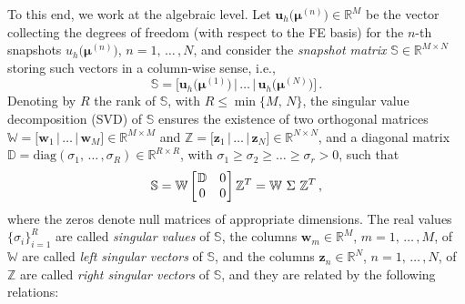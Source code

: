 \documentclass[12pt, a4paper, twoside, openright, notitlepage]{report}
\numberwithin{equation}{chapter}
\theoremstyle{theorem}
\theoremstyle{definition}
\theoremstyle{remark}
\theoremstyle{proposition}
\numberwithin{figure}{chapter}
\newcommand{\bg}[1]{\boldsymbol{#1}}
\begin{document}
		To this end, we work at the algebraic level. Let $\mathbf{u}_h \big( \bg{\mu}^{(n)} \big) \in \mathbb{R}^M$ be the vector collecting the degrees of freedom (with respect to the FE basis) for the $n$-th snapshots $u_h \big( \bg{\mu}^{(n)} \big)$, $n = 1, \, \ldots \, , N$, and consider the \emph{snapshot matrix} $\mathbb{S} \in \mathbb{R}^{M \times N}$ storing such vectors in a column-wise sense, i.e.,
		\begin{equation*}
			\mathbb{S} = \big[ \mathbf{u}_h \big( \bg{\mu}^{(1)} \big) \, \big| \, \ldots \, \big| \, \mathbf{u}_h \big( \bg{\mu}^{(N)} \big) \big] \, .
		\end{equation*}
		Denoting by $R$ the rank of $\mathbb{S}$, with $R \leq \min \big\lbrace{ M, \, N \big\rbrace}$, the singular value decomposition (SVD) of $\mathbb{S}$ ensures the existence of two orthogonal matrices $\mathbb{W} = \big[ \mathbf{w}_1 \, \big| \, \ldots \, \big| \, \mathbf{w}_M \big] \in \mathbb{R}^{M \times M}$ and $\mathbb{Z} = \big[ \mathbf{z}_1 \, \big| \, \ldots \, \big| \, \mathbf{z}_N \big] \in \mathbb{R}^{N \times N}$, and a diagonal matrix $\mathbb{D} = \text{diag}(\sigma_1, \, \ldots \, , \sigma_R) \in \mathbb{R}^{R \times R}$, with $\sigma_1 \geq \sigma_2 \geq \ldots \geq \sigma_r > 0$, such that
		\begin{equation}
			\label{eq:svd}
			\mathbb{S} = \mathbb{W} 
			\begin{bmatrix}
			\hspace*{-0.15cm}
			\begin{array}{cc}
				\mathbb{D} & 0 \\
				0 & 0
			\end{array} 
			\hspace*{-0.15cm}
			\end{bmatrix}
			\mathbb{Z}^T = \mathbb{W} ~ \Sigma ~ \mathbb{Z}^T \, ,
		\end{equation}
		where the zeros denote null matrices of appropriate dimensions. The real values $\big\lbrace \sigma_i \big\rbrace_{i = 1}^R$ are called \emph{singular values} of $\mathbb{S}$, the columns $\mathbf{w}_m \in \mathbb{R}^M$, $m = 1, \, \ldots \, , M$, of $\mathbb{W}$ are called \emph{left singular vectors} of $\mathbb{S}$, and the columns $\mathbf{z}_n \in \mathbb{R}^N$, $n = 1, \, \ldots \, , N$, of $\mathbb{Z}$ are called \emph{right singular vectors} of $\mathbb{S}$, and they are related by the following relations:
\end{document}
